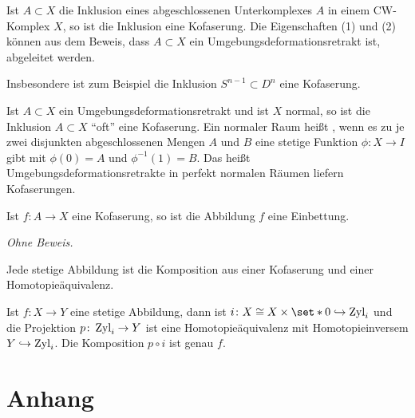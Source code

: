 \begin{beispiel}
	Ist $A \subset X$ die Inklusion eines abgeschlossenen Unterkomplexes $A$ in einem CW-Komplex $X$, so ist die Inklusion eine Kofaserung.
	Die Eigenschaften (1) und (2) können aus dem Beweis, dass $A \subset X$ ein Umgebungsdeformationsretrakt ist, abgeleitet werden.
	
	Insbesondere ist zum Beispiel die Inklusion $S^{n-1} \subset D^n$ eine Kofaserung.
\end{beispiel}

\begin{bemerkung}
	Ist $A \subset X$ ein Umgebungsdeformationsretrakt und ist $X$ normal, so ist die Inklusion $A \subset X$ \enquote{oft} eine Kofaserung.
	Ein normaler Raum heißt , wenn es zu je zwei disjunkten abgeschlossenen Mengen $A$ und $B$ eine stetige Funktion $\phi \colon X \to I$ gibt mit $\phi(0) =A$ und $\phi^{-1}(1)=B$.
	Das heißt Umgebungsdeformationsretrakte in perfekt normalen Räumen liefern Kofaserungen.
\end{bemerkung}

\begin{satz}
	Ist $f \colon A \to X$ eine Kofaserung, so ist die Abbildung $f$ eine Einbettung.
\end{satz}
\begin{beweis}
	\emph{Ohne Beweis.}
\end{beweis}

\begin{satz}
	Jede stetige Abbildung ist die Komposition aus einer Kofaserung und einer Homotopieäquivalenz.
\end{satz}
\begin{beweis}
	Ist $f \colon X \to Y$ eine stetige Abbildung, dann ist $i \colon X \cong X \times \set*{0} \hookrightarrow \Zyl_i$ und die Projektion $p \colon \operatorname{Zyl}_i \to Y$ ist eine Homotopieäquivalenz mit Homotopieinversem $Y \hookrightarrow \operatorname{Zyl}_i$.
	Die Komposition $p \circ i$ ist genau $f$.
\end{beweis}

\cleardoubleoddemptypage
{}
\setcounter{page}{1}
\cleardoubleoddemptypage
\appendix

\section{Anhang} %
\label{sec:anhang}

\printindex
\printbibliography
\listoffigures
\todototoc
{}


